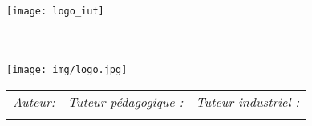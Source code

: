 \begin{titlepage}
\begin{center}

~\\[1cm]
\textsc{\large \Formation}\\[1cm]

\texttt{[image: logo\_iut]}~\\[1cm]

\textsc{\LARGE \Content}\\[2cm]

{ \huge \bfseries \Title \\[2cm] }

\texttt{[image: img/logo.jpg]}~\\[1cm]

\resizebox{\textwidth}{!} {\tiny
	\begin{tabular}{lll}
		\emph{Auteur:} & \emph{Tuteur pédagogique :} & \emph{Tuteur industriel :} \\
		\Author & \Schooltutor{} & \Protutor
	\end{tabular}
}

\vfill

{\large \Date}

\end{center}
\end{titlepage}
